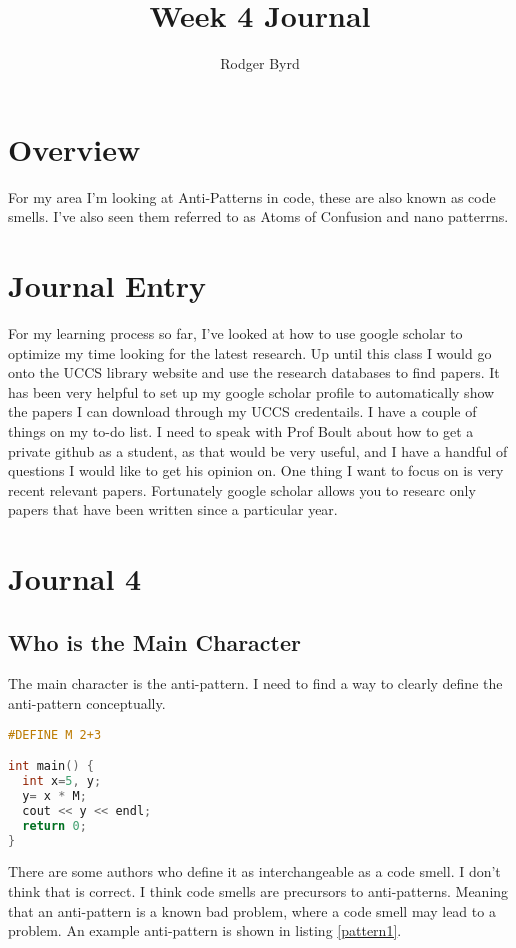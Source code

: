 \documentclass[conference]{IEEEtran}
\begin{document}

\title{Week 4 Journal}
\author{Rodger Byrd}
\maketitle


\section{Overview}
For my area I'm looking at Anti-Patterns in code, these are also known as code smells. I've also seen them referred to as Atoms of Confusion and nano patterrns.

\section{Journal Entry}
For my learning process so far, I've looked at how to use google scholar to optimize my time looking for the latest research.
Up until this class I would go onto the UCCS library website and use the research databases to find papers. 
It has been very helpful to set up my google scholar profile to automatically show the papers I can download through my UCCS credentails.
I have a couple of things on my to-do list.
I need to speak with Prof Boult about how to get a private github as a student, as that would be very useful, and I have a handful of questions I would like to get his opinion on. 
One thing I want to focus on is very recent relevant papers.
Fortunately google scholar allows you to researc only papers that have been written since a particular year.

\section{Journal 4}
\subsection{Who is the Main Character}
The main character is the anti-pattern. I need to find a way to clearly define the anti-pattern conceptually. 

\begin{lstlisting}[language=C,frame=single,caption=Example Anti-Pattern,label=pattern1]
#DEFINE M 2+3

int main() {
  int x=5, y;
  y= x * M;
  cout << y << endl;
  return 0;
}
\end{lstlisting}

There are some authors who define it as interchangeable as a code smell. 
I don't think that is correct. 
I think code smells are precursors to anti-patterns. 
Meaning that an anti-pattern is a known bad problem, where a code smell may lead to a problem.
An example anti-pattern is shown in listing \ref{pattern1}.
\end{document}
